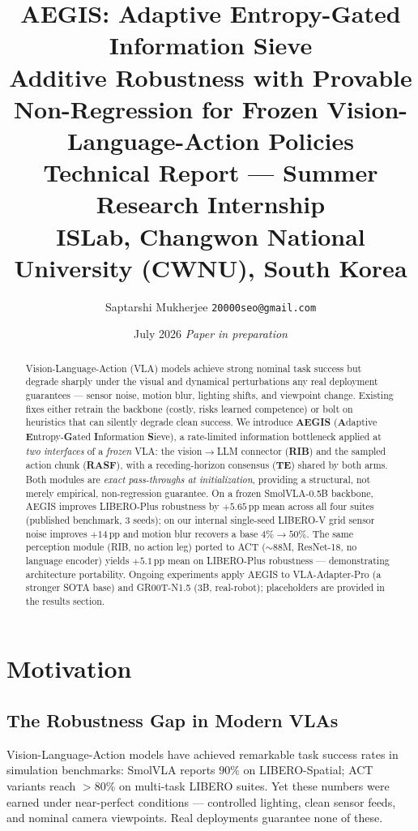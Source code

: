 \documentclass[11pt,a4paper]{article}
\title{
  \vspace{-1cm}
  {\Large\bfseries AEGIS: Adaptive Entropy-Gated Information Sieve}\\[0.4em]
  {\large Additive Robustness with Provable Non-Regression for Frozen Vision-Language-Action Policies}\\[0.6em]
  {\normalsize Technical Report — Summer Research Internship}\\
  {\normalsize ISLab, Changwon National University (CWNU), South Korea}
}
\author{Saptarshi Mukherjee \quad \texttt{20000seo@gmail.com}}
\date{July 2026 \quad\quad \textit{Paper in preparation}}
\newcommand{\aegis}{\textbf{AEGIS}}
\newcommand{\rib}{\textbf{RIB}}
\newcommand{\rasf}{\textbf{RASF}}
\newcommand{\te}{\textbf{TE}}
\begin{document}
\maketitle
\thispagestyle{fancy}

\begin{abstract}
Vision-Language-Action (VLA) models achieve strong nominal task success but degrade sharply
under the visual and dynamical perturbations any real deployment guarantees — sensor noise,
motion blur, lighting shifts, and viewpoint change. Existing fixes either retrain the backbone
(costly, risks learned competence) or bolt on heuristics that can silently degrade clean success.
We introduce \aegis{} (\textbf{A}daptive \textbf{E}ntropy-\textbf{G}ated \textbf{I}nformation
\textbf{S}ieve), a rate-limited information bottleneck applied at \emph{two interfaces} of a
\emph{frozen} VLA: the vision$\to$LLM connector (\rib{}) and the sampled action chunk (\rasf{}),
with a receding-horizon consensus (\te{}) shared by both arms. Both modules are \emph{exact
pass-throughs at initialization}, providing a structural, not merely empirical, non-regression
guarantee. On a frozen SmolVLA-0.5B backbone, AEGIS improves LIBERO-Plus robustness by
$+5.65$\,pp mean across all four suites (published benchmark, 3 seeds); on our internal
single-seed LIBERO-V grid sensor noise improves $+14$\,pp and motion blur recovers a base
$4\%\to50\%$. The same perception module (RIB, no action leg) ported to ACT ($\sim$88M, ResNet-18,
no language encoder) yields $+5.1$\,pp mean on LIBERO-Plus robustness — demonstrating architecture
portability.
Ongoing experiments apply AEGIS to VLA-Adapter-Pro (a stronger SOTA base) and GR00T-N1.5
(3B, real-robot); placeholders are provided in the results section.
\end{abstract}

\section{Motivation}
\label{sec:motivation}

\subsection{The Robustness Gap in Modern VLAs}

Vision-Language-Action models have achieved remarkable task success rates in simulation
benchmarks: SmolVLA reports $90\%$ on LIBERO-Spatial; ACT variants reach $>80\%$ on
multi-task LIBERO suites. Yet these numbers were earned under near-perfect conditions —
controlled lighting, clean sensor feeds, and nominal camera viewpoints. Real deployments
guarantee none of these.
\end{document}
